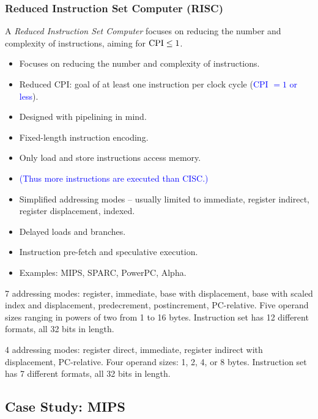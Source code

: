 \subsubsection{Reduced Instruction Set Computer (RISC)}

\begin{definition}[RISC]
A \emph{Reduced Instruction Set Computer} focuses on reducing the number and
complexity of instructions, aiming for $\mathrm{CPI} \le 1$.
\end{definition}
\begin{itemize}
  \item Focuses on reducing the number and complexity of instructions.
  \item Reduced CPI: goal of at least one instruction per clock cycle
  (\textcolor{blue}{CPI $=1$ or less}).
  \item Designed with pipelining in mind.
  \item Fixed-length instruction encoding.
  \item Only load and store instructions access memory.
  \item \textcolor{blue}{(Thus more instructions are executed than CISC.)}
  \item Simplified addressing modes -- usually limited to immediate,
  register indirect, register displacement, indexed.
  \item Delayed loads and branches.
  \item Instruction pre-fetch and speculative execution.
  \item Examples: MIPS, SPARC, PowerPC, Alpha.
\end{itemize}

\begin{eg}
7 addressing
modes: register, immediate, base with displacement, base with scaled index
and displacement, predecrement, postincrement, PC-relative. Five operand
sizes ranging in powers of two from 1 to 16 bytes. Instruction set has 12
different formats, all 32 bits in length.
\end{eg}

\begin{eg}
4 addressing modes: register direct,
immediate, register indirect with displacement, PC-relative. Four operand
sizes: 1, 2, 4, or 8 bytes. Instruction set has 7 different formats, all 32
bits in length.
\end{eg}

\subsection{Case Study: MIPS}
\label{sec:mips}

